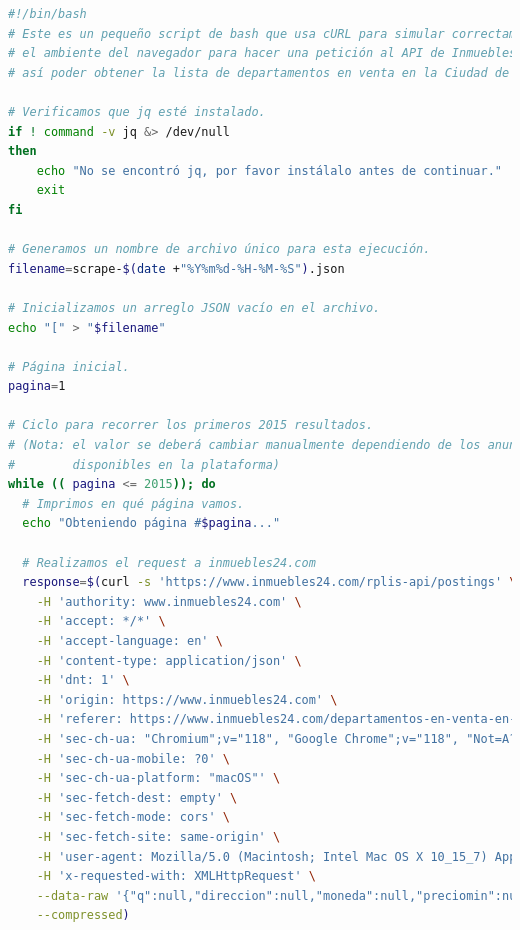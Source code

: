 \begin{lstlisting}[language=bash, caption={Código fuente del \textit{web scraper}}, label={lst:web_scraper}]
#!/bin/bash
# Este es un pequeño script de bash que usa cURL para simular correctamente a
# el ambiente del navegador para hacer una petición al API de Inmuebles24 y
# así poder obtener la lista de departamentos en venta en la Ciudad de México.

# Verificamos que jq esté instalado.
if ! command -v jq &> /dev/null
then
    echo "No se encontró jq, por favor instálalo antes de continuar."
    exit
fi

# Generamos un nombre de archivo único para esta ejecución.
filename=scrape-$(date +"%Y%m%d-%H-%M-%S").json

# Inicializamos un arreglo JSON vacío en el archivo.
echo "[" > "$filename"

# Página inicial.
pagina=1

# Ciclo para recorrer los primeros 2015 resultados.
# (Nota: el valor se deberá cambiar manualmente dependiendo de los anuncios
#        disponibles en la plataforma)
while (( pagina <= 2015)); do
  # Imprimos en qué página vamos.
  echo "Obteniendo página #$pagina..."

  # Realizamos el request a inmuebles24.com
  response=$(curl -s 'https://www.inmuebles24.com/rplis-api/postings' \
    -H 'authority: www.inmuebles24.com' \
    -H 'accept: */*' \
    -H 'accept-language: en' \
    -H 'content-type: application/json' \
    -H 'dnt: 1' \
    -H 'origin: https://www.inmuebles24.com' \
    -H 'referer: https://www.inmuebles24.com/departamentos-en-venta-en-ciudad-de-mexico.html' \
    -H 'sec-ch-ua: "Chromium";v="118", "Google Chrome";v="118", "Not=A?Brand";v="99"' \
    -H 'sec-ch-ua-mobile: ?0' \
    -H 'sec-ch-ua-platform: "macOS"' \
    -H 'sec-fetch-dest: empty' \
    -H 'sec-fetch-mode: cors' \
    -H 'sec-fetch-site: same-origin' \
    -H 'user-agent: Mozilla/5.0 (Macintosh; Intel Mac OS X 10_15_7) AppleWebKit/537.36 (KHTML, like Gecko) Chrome/118.0.0.0 Safari/537.36' \
    -H 'x-requested-with: XMLHttpRequest' \
    --data-raw '{"q":null,"direccion":null,"moneda":null,"preciomin":null,"preciomax":null,"services":"","general":"","searchbykeyword":"","amenidades":"","caracteristicasprop":null,"comodidades":"","disposicion":null,"roomType":"","outside":"","areaPrivativa":"","areaComun":"","multipleRets":"","tipoDePropiedad":"2","subtipoDePropiedad":null,"tipoDeOperacion":"1","garages":null,"antiguedad":null,"expensasminimo":null,"expensasmaximo":null,"habitacionesminimo":0,"habitacionesmaximo":0,"ambientesminimo":0,"ambientesmaximo":0,"banos":null,"superficieCubierta":1,"idunidaddemedida":1,"metroscuadradomin":null,"metroscuadradomax":null,"tipoAnunciante":"ALL","grupoTipoDeMultimedia":"","publicacion":null,"sort":"more_recent","etapaDeDesarrollo":"","auctions":null,"polygonApplied":null,"idInmobiliaria":null,"excludePostingContacted":"","banks":"","places":"","condominio":"","pagina":'"$pagina"',"city":null,"province":"69","zone":null,"valueZone":null,"subZone":null,"coordenates":null}' \
    --compressed)


\end{lstlisting}
